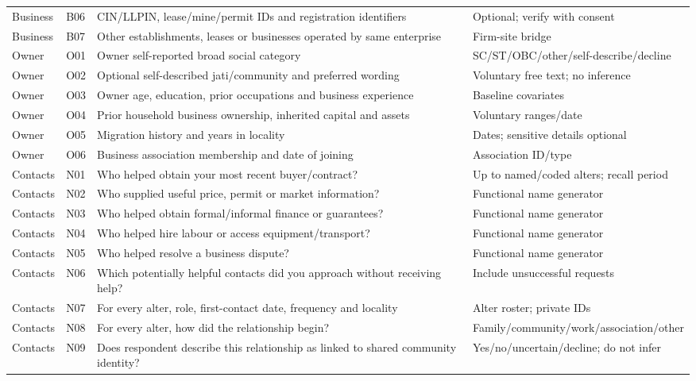 \documentclass[11pt,a4paper]{report}
\begin{document}
\begin{longtable}{>{\raggedright\arraybackslash}p{1.8cm}l>{\raggedright\arraybackslash}p{7.5cm}>{\raggedright\arraybackslash}p{4.5cm}}
Business & B06 & CIN/\allowbreak{}LLPIN, lease/\allowbreak{}mine/\allowbreak{}permit IDs and registration identifiers & Optional; verify with consent \\
Business & B07 & Other establishments, leases or businesses operated by same enterprise & Firm-site bridge \\
Owner & O01 & Owner self-reported broad social category & SC/\allowbreak{}ST/\allowbreak{}OBC/\allowbreak{}other/\allowbreak{}self-describe/\allowbreak{}decline \\
Owner & O02 & Optional self-described jati/\allowbreak{}community and preferred wording & Voluntary free text; no inference \\
Owner & O03 & Owner age, education, prior occupations and business experience & Baseline covariates \\
Owner & O04 & Prior household business ownership, inherited capital and assets & Voluntary ranges/\allowbreak{}date \\
Owner & O05 & Migration history and years in locality & Dates; sensitive details optional \\
Owner & O06 & Business association membership and date of joining & Association ID/\allowbreak{}type \\
Contacts & N01 & Who helped obtain your most recent buyer/\allowbreak{}contract? & Up to named/\allowbreak{}coded alters; recall period \\
Contacts & N02 & Who supplied useful price, permit or market information? & Functional name generator \\
Contacts & N03 & Who helped obtain formal/\allowbreak{}informal finance or guarantees? & Functional name generator \\
Contacts & N04 & Who helped hire labour or access equipment/\allowbreak{}transport? & Functional name generator \\
Contacts & N05 & Who helped resolve a business dispute? & Functional name generator \\
Contacts & N06 & Which potentially helpful contacts did you approach without receiving help? & Include unsuccessful requests \\
Contacts & N07 & For every alter, role, first-contact date, frequency and locality & Alter roster; private IDs \\
Contacts & N08 & For every alter, how did the relationship begin? & Family/\allowbreak{}community/\allowbreak{}work/\allowbreak{}association/\allowbreak{}other \\
Contacts & N09 & Does respondent describe this relationship as linked to shared community identity? & Yes/\allowbreak{}no/\allowbreak{}uncertain/\allowbreak{}decline; do not infer \\

\end{longtable}
\end{document}
